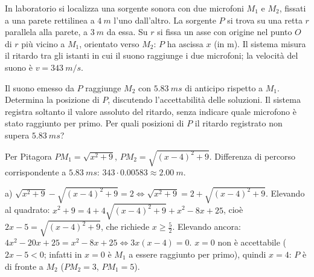 \documentclass[10pt]{article}
\begin{document}
{%
\exercise In laboratorio si localizza una sorgente sonora con due microfoni $M_1$ e $M_2$, fissati
a una parete rettilinea a $\qty{4}{m}$ l'uno dall'altro. La sorgente $P$ si trova su una retta $r$
parallela alla parete, a $\qty{3}{m}$ da essa. Su $r$ si fissa un asse con origine nel punto $O$ di $r$
più vicino a $M_1$, orientato verso $M_2$: $P$ ha ascissa $x$ (in m). Il sistema misura il ritardo
tra gli istanti in cui il suono raggiunge i due microfoni; la velocità del suono è $v = \qty{343}{m/s}$.

\vspace{.5em}
\noindent
\begin{minipage}[c]{.3\linewidth}
  \centering
\end{minipage}\hfill
\begin{minipage}[c]{.68\linewidth}
  \begin{parts}[stretch=1.4]
    \itemx[pts=2, diff=2] Il suono emesso da $P$ raggiunge $M_2$ con $\qty{5.83}{ms}$ di anticipo rispetto a $M_1$. Determina la posizione di $P$, discutendo l'accettabilità delle soluzioni.
    \itemx[pts=1.5, diff=3] Il sistema registra soltanto il valore assoluto del ritardo, senza indicare quale microfono è stato raggiunto per primo. Per quali posizioni di $P$ il ritardo registrato non supera $\qty{5.83}{ms}$?
  \end{parts}
\end{minipage}

\begin{solution}
Per Pitagora $PM_1 = \sqrt{x^2 + 9}$, $PM_2 = \sqrt{(x - 4)^2 + 9}$. Differenza di percorso
corrispondente a $\qty{5.83}{ms}$: $343 \cdot 0.00583 \approx \qty{2.00}{m}$.

a) $\sqrt{x^2 + 9} - \sqrt{(x-4)^2 + 9} = 2 \iff \sqrt{x^2 + 9} = 2 + \sqrt{(x-4)^2 + 9}$. Elevando al
quadrato: $x^2 + 9 = 4 + 4\sqrt{(x-4)^2 + 9} + x^2 - 8x + 25$, cioè $2x - 5 = \sqrt{(x-4)^2 + 9}$, che
richiede $x \geq \frac52$. Elevando ancora: $4x^2 - 20x + 25 = x^2 - 8x + 25 \iff 3x(x - 4) = 0$.
$x = 0$ non è accettabile ($2x - 5 < 0$; infatti in $x = 0$ è $M_1$ a essere raggiunto per primo),
quindi $x = 4$: $P$ è di fronte a $M_2$ ($PM_2 = 3$, $PM_1 = 5$).


\end{solution}}
\end{document}
